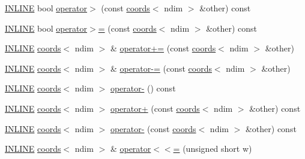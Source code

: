 \begin{DoxyCompactItemize}
\item 
\hyperlink{common_8hpp_a2eb6f9e0395b47b8d5e3eeae4fe0c116}{I\+N\+L\+I\+NE} bool \hyperlink{structshark_1_1ndim_1_1coords_abef8a867112ca851dc39c030ef57bd82}{operator$>$} (const \hyperlink{structshark_1_1ndim_1_1coords}{coords}$<$ ndim $>$ \&other) const
\item 
\hyperlink{common_8hpp_a2eb6f9e0395b47b8d5e3eeae4fe0c116}{I\+N\+L\+I\+NE} bool \hyperlink{structshark_1_1ndim_1_1coords_ac88fb12351942d33b2041941c0109258}{operator$>$=} (const \hyperlink{structshark_1_1ndim_1_1coords}{coords}$<$ ndim $>$ \&other) const
\item 
\hyperlink{common_8hpp_a2eb6f9e0395b47b8d5e3eeae4fe0c116}{I\+N\+L\+I\+NE} \hyperlink{structshark_1_1ndim_1_1coords}{coords}$<$ ndim $>$ \& \hyperlink{structshark_1_1ndim_1_1coords_a116697a6b24f4b700b920d8af4b4f17d}{operator+=} (const \hyperlink{structshark_1_1ndim_1_1coords}{coords}$<$ ndim $>$ \&other)
\item 
\hyperlink{common_8hpp_a2eb6f9e0395b47b8d5e3eeae4fe0c116}{I\+N\+L\+I\+NE} \hyperlink{structshark_1_1ndim_1_1coords}{coords}$<$ ndim $>$ \& \hyperlink{structshark_1_1ndim_1_1coords_ad6f436507ab3409fe01edde347a665a9}{operator-\/=} (const \hyperlink{structshark_1_1ndim_1_1coords}{coords}$<$ ndim $>$ \&other)
\item 
\hyperlink{common_8hpp_a2eb6f9e0395b47b8d5e3eeae4fe0c116}{I\+N\+L\+I\+NE} \hyperlink{structshark_1_1ndim_1_1coords}{coords}$<$ ndim $>$ \hyperlink{structshark_1_1ndim_1_1coords_a013d9ad7f7c14ba57c5d08846019d6ad}{operator-\/} () const
\item 
\hyperlink{common_8hpp_a2eb6f9e0395b47b8d5e3eeae4fe0c116}{I\+N\+L\+I\+NE} \hyperlink{structshark_1_1ndim_1_1coords}{coords}$<$ ndim $>$ \hyperlink{structshark_1_1ndim_1_1coords_a0ce449dfa3670895f990acdee7ed50e8}{operator+} (const \hyperlink{structshark_1_1ndim_1_1coords}{coords}$<$ ndim $>$ \&other) const
\item 
\hyperlink{common_8hpp_a2eb6f9e0395b47b8d5e3eeae4fe0c116}{I\+N\+L\+I\+NE} \hyperlink{structshark_1_1ndim_1_1coords}{coords}$<$ ndim $>$ \hyperlink{structshark_1_1ndim_1_1coords_a642618334175f93887e2b1cfab694c6b}{operator-\/} (const \hyperlink{structshark_1_1ndim_1_1coords}{coords}$<$ ndim $>$ \&other) const
\item 
\hyperlink{common_8hpp_a2eb6f9e0395b47b8d5e3eeae4fe0c116}{I\+N\+L\+I\+NE} \hyperlink{structshark_1_1ndim_1_1coords}{coords}$<$ ndim $>$ \& \hyperlink{structshark_1_1ndim_1_1coords_ab30deb6afb13045c0cb59d90818bc122}{operator$<$$<$=} (unsigned short w)
\item 

\end{DoxyCompactItemize}
